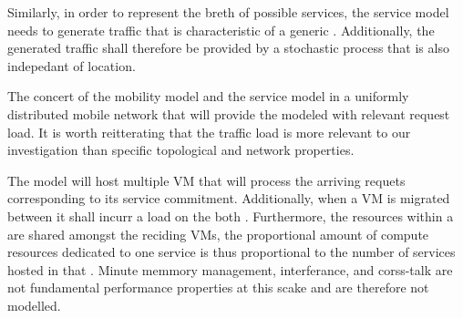 Similarly, in order to represent the breth of possible services, the service model needs to generate traffic that is characteristic of a generic \ue. Additionally, the generated traffic shall therefore be provided by a stochastic process that is also indepedant of location.

The concert of the mobility model and the service model in a uniformly distributed mobile network that will provide the modeled \dcs with relevant request load. It is worth reitterating that the traffic load is more relevant to our investigation than specific topological and network properties.

The \dc model will host multiple VM that will process the arriving requets corresponding to its service commitment. Additionally, when a VM is migrated between \dcs it shall incurr a load on the both \dcs. Furthermore, the resources within a \dc are shared amongst the reciding VMs, the proportional amount of compute resources dedicated to one service is thus proportional to the number of services hosted in that \dc.  Minute memmory management, interferance, and corss-talk are not fundamental performance properties at this scake and are therefore not modelled.